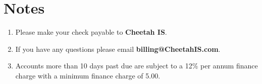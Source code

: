 \documentclass[letterpaper]{article}
\newcommand{\dollar}[1][]{\symbol{36}}
\begin{document}
\section*{\small{\textbf{Notes}}}\vspace{-0.35cm}
\small{\begin{enumerate}
\item Please make your check payable to \textbf{Cheetah IS}.
\item If you have any questions please email \textbf{billing@CheetahIS.com}.
\item Accounts more than 10 days past due are subject to a 12\% per annum finance charge with a minimum finance charge of \dollar 5.00.
\end{enumerate}}
\end{document}
